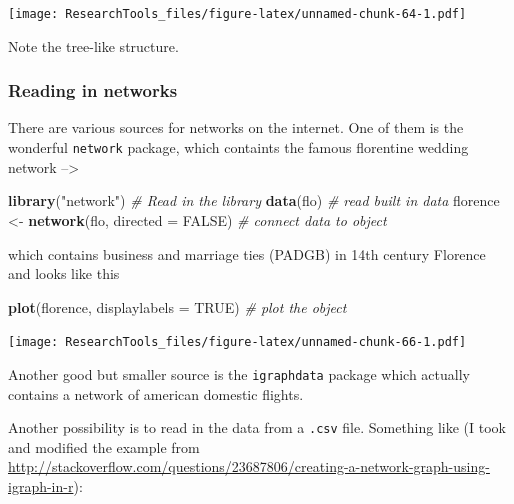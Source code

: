 \documentclass[]{article}
\newenvironment{Shaded}{\begin{snugshade}}{\end{snugshade}}
\newcommand{\KeywordTok}[1]{\textcolor[rgb]{0.13,0.29,0.53}{\textbf{#1}}}
\newcommand{\DataTypeTok}[1]{\textcolor[rgb]{0.13,0.29,0.53}{#1}}
\newcommand{\StringTok}[1]{\textcolor[rgb]{0.31,0.60,0.02}{#1}}
\newcommand{\CommentTok}[1]{\textcolor[rgb]{0.56,0.35,0.01}{\textit{#1}}}
\newcommand{\OtherTok}[1]{\textcolor[rgb]{0.56,0.35,0.01}{#1}}
\newcommand{\NormalTok}[1]{#1}
\theoremstyle{definition}
\theoremstyle{definition}
\theoremstyle{definition}
\theoremstyle{remark}
\begin{document}
\texttt{[image: ResearchTools\_files/figure-latex/unnamed-chunk-64-1.pdf]}

Note the tree-like structure.

\subsubsection{Reading in networks}\label{reading-in-networks}

There are various sources for networks on the internet. One of them is
the wonderful \texttt{network} package, which containts the famous
florentine wedding network --\textgreater{}

\begin{Shaded}
\begin{Highlighting}[]
\KeywordTok{library}\NormalTok{(}\StringTok{"network"}\NormalTok{)                 }\CommentTok{# Read in the library}
\KeywordTok{data}\NormalTok{(flo)                          }\CommentTok{# read built in data}
\NormalTok{florence <-}\StringTok{ }\KeywordTok{network}\NormalTok{(flo, }\DataTypeTok{directed =} \OtherTok{FALSE}\NormalTok{) }\CommentTok{# connect data to object}
\end{Highlighting}
\end{Shaded}

which contains business and marriage ties (PADGB) in 14th century
Florence and looks like this

\begin{Shaded}
\begin{Highlighting}[]
\KeywordTok{plot}\NormalTok{(florence, }\DataTypeTok{displaylabels =} \OtherTok{TRUE}\NormalTok{) }\CommentTok{# plot the object}
\end{Highlighting}
\end{Shaded}

\texttt{[image: ResearchTools\_files/figure-latex/unnamed-chunk-66-1.pdf]}

Another good but smaller source is the \texttt{igraphdata} package which
actually contains a network of american domestic flights.

Another possibility is to read in the data from a \texttt{.csv} file.
Something like (I took and modified the example from
\url{http://stackoverflow.com/questions/23687806/creating-a-network-graph-using-igraph-in-r}):
\end{document}
